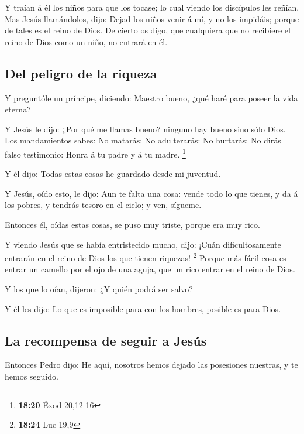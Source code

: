  Y traían á él los niños para que los tocase; lo cual
viendo los discípulos les reñían.  Mas Jesús llamándolos,
dijo: Dejad los niños venir á mí, y no los impidáis; porque de tales es
el reino de Dios.  De cierto os digo, que cualquiera que no
recibiere el reino de Dios como un niño, no entrará en él.

\hypertarget{del-peligro-de-la-riqueza}{%
\subsection{Del peligro de la riqueza}\label{del-peligro-de-la-riqueza}}

 Y preguntóle un príncipe, diciendo: Maestro bueno, ¿qué
haré para poseer la vida eterna?

 Y Jesús le dijo: ¿Por qué me llamas bueno? ninguno hay
bueno sino sólo Dios.  Los mandamientos sabes: No matarás:
No adulterarás: No hurtarás: No dirás falso testimonio: Honra á tu padre
y á tu madre. \footnote{\textbf{18:20} Éxod 20,12-16}

 Y él dijo: Todas estas cosas he guardado desde mi
juventud.

 Y Jesús, oído esto, le dijo: Aun te falta una cosa: vende
todo lo que tienes, y da á los pobres, y tendrás tesoro en el cielo; y
ven, sígueme.

 Entonces él, oídas estas cosas, se puso muy triste, porque
era muy rico.

 Y viendo Jesús que se había entristecido mucho, dijo:
¡Cuán dificultosamente entrarán en el reino de Dios los que tienen
riquezas! \footnote{\textbf{18:24} Luc 19,9}  Porque más
fácil cosa es entrar un camello por el ojo de una aguja, que un rico
entrar en el reino de Dios.

 Y los que lo oían, dijeron: ¿Y quién podrá ser salvo?

 Y él les dijo: Lo que es imposible para con los hombres,
posible es para Dios.

\hypertarget{la-recompensa-de-seguir-a-jesuxfas}{%
\subsection{La recompensa de seguir a
Jesús}\label{la-recompensa-de-seguir-a-jesuxfas}}

 Entonces Pedro dijo: He aquí, nosotros hemos dejado las
posesiones nuestras, y te hemos seguido.

